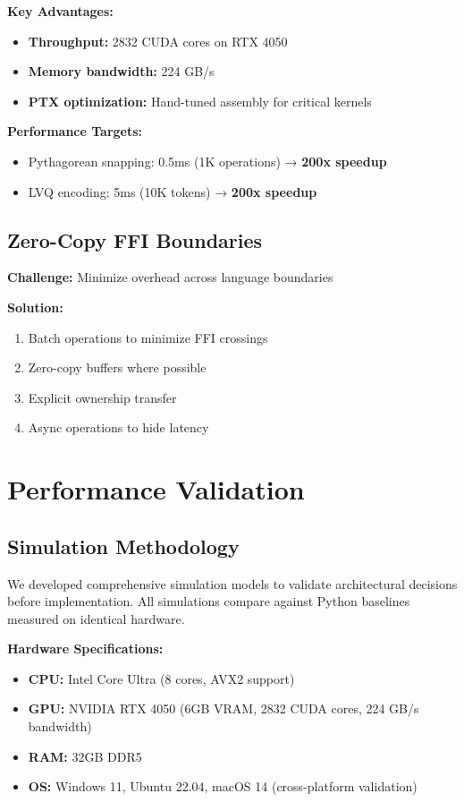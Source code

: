 \documentclass{article}
\begin{document}
\textbf{Key Advantages:}
\begin{itemize}
    \item \textbf{Throughput:} 2832 CUDA cores on RTX 4050
    \item \textbf{Memory bandwidth:} 224 GB/s
    \item \textbf{PTX optimization:} Hand-tuned assembly for critical kernels
\end{itemize}

\textbf{Performance Targets:}
\begin{itemize}
    \item Pythagorean snapping: 0.5ms (1K operations) → \textbf{200x speedup}
    \item LVQ encoding: 5ms (10K tokens) → \textbf{200x speedup}
\end{itemize}

\subsection{Zero-Copy FFI Boundaries}

\textbf{Challenge:} Minimize overhead across language boundaries

\textbf{Solution:}
\begin{enumerate}
    \item Batch operations to minimize FFI crossings
    \item Zero-copy buffers where possible
    \item Explicit ownership transfer
    \item Async operations to hide latency
\end{enumerate}

\section{Performance Validation}

\subsection{Simulation Methodology}

We developed comprehensive simulation models to validate architectural decisions before implementation. All simulations compare against Python baselines measured on identical hardware.

\textbf{Hardware Specifications:}
\begin{itemize}
    \item \textbf{CPU:} Intel Core Ultra (8 cores, AVX2 support)
    \item \textbf{GPU:} NVIDIA RTX 4050 (6GB VRAM, 2832 CUDA cores, 224 GB/s bandwidth)
    \item \textbf{RAM:} 32GB DDR5
    \item \textbf{OS:} Windows 11, Ubuntu 22.04, macOS 14 (cross-platform validation)
\end{itemize}
\end{document}

